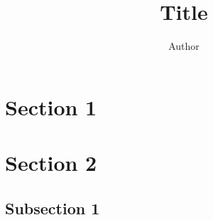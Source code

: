\documentclass[a4paper,11pt,twocolumn]{article}
\begin{document}
	
	\title{Title}
	\author{Author}	
	\maketitle

	\tableofcontents
	
	\section{Section 1}
	\lipsum[2-5]
	\section{Section 2}
	\subsection{Subsection 1}
	
\end{document}
